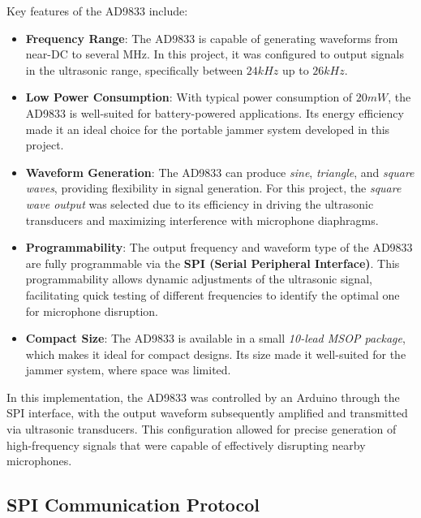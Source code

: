 Key features of the AD9833 include:

\begin{itemize}
    \item \textbf{Frequency Range}: The AD9833 is capable of generating waveforms from near-DC to several MHz. In this project, it was configured to output signals in the ultrasonic range, specifically between $24 kHz$ up to $26 kHz$.
    
    \item \textbf{Low Power Consumption}: With typical power consumption of $20 mW$, the AD9833 is well-suited for battery-powered applications. Its energy efficiency made it an ideal choice for the portable jammer system developed in this project.
    
    \item \textbf{Waveform Generation}: The AD9833 can produce \textit{sine}, \textit{triangle}, and \textit{square waves}, providing flexibility in signal generation. For this project, the \textit{square wave output} was selected due to its efficiency in driving the ultrasonic transducers and maximizing interference with microphone diaphragms.
    
    \item \textbf{Programmability}: The output frequency and waveform type of the AD9833 are fully programmable via the \textbf{SPI (Serial Peripheral Interface)}. This programmability allows dynamic adjustments of the ultrasonic signal, facilitating quick testing of different frequencies to identify the optimal one for microphone disruption.
    
    \item \textbf{Compact Size}: The AD9833 is available in a small \textit{10-lead MSOP package}, which makes it ideal for compact designs. Its size made it well-suited for the jammer system, where space was limited.
\end{itemize}

In this implementation, the AD9833 was controlled by an Arduino through the SPI interface, with the output waveform subsequently amplified and transmitted via ultrasonic transducers. This configuration allowed for precise generation of high-frequency signals that were capable of effectively disrupting nearby microphones.

\subsection{SPI Communication Protocol}

